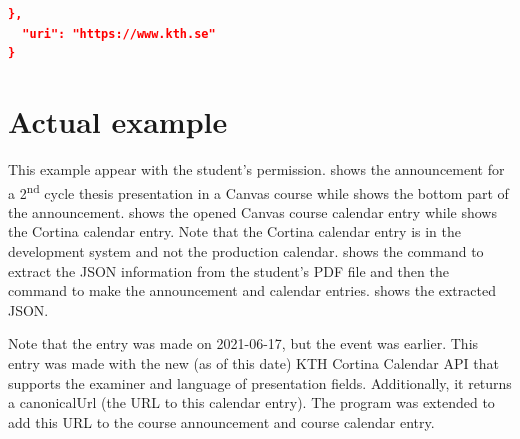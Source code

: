 \begin{lstlisting}[language={json}, caption={Response from the KTH Cortina API},label=lst:cortinaResponse]
  },
  "uri": "https://www.kth.se"
}
\end{lstlisting}


\section{Actual example}
This example appear with the student’s permission.  shows the announcement for a 2\textsuperscript{nd} cycle thesis presentation in a Canvas course while  shows the bottom part of the announcement.  shows the opened Canvas course calendar entry while  shows the Cortina calendar entry. Note that the Cortina calendar entry is in the development system and not the production calendar.  shows the command to extract the JSON information from the student’s PDF file and then the command to make the announcement and calendar entries.  shows the extracted JSON.

Note that the entry was made on 2021-06-17, but the event was earlier. This entry was made with the new (as of this date) KTH Cortina Calendar API that supports the examiner and language of presentation fields. Additionally, it returns a canonicalUrl (the URL to this calendar entry). The program was extended to add this URL to the course announcement and course calendar entry.

